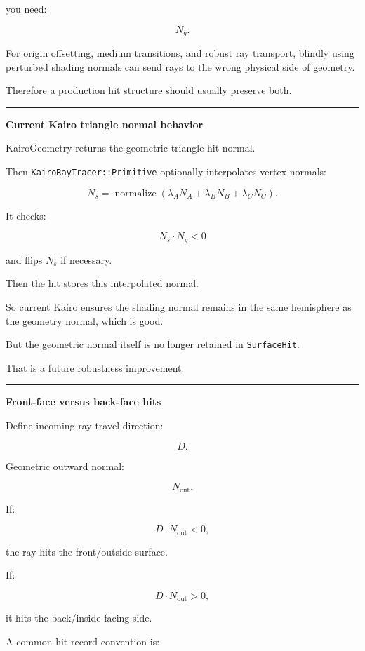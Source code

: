 you need:

\[
N_g.
\]

For origin offsetting, medium transitions, and robust ray transport, blindly using perturbed shading normals can send rays to the wrong physical side of geometry.

Therefore a production hit structure should usually preserve both.

\begin{center}\rule{0.5\linewidth}{0.5pt}\end{center}

\textbf{Current Kairo triangle normal behavior}

KairoGeometry returns the geometric triangle hit normal.

Then \texttt{KairoRayTracer::Primitive} optionally interpolates vertex normals:

\[
N_s=
\operatorname{normalize}
(
\lambda_A N_A+
\lambda_B N_B+
\lambda_C N_C
).
\]

It checks:

\[
N_s\cdot N_g<0
\]

and flips \(N_s\) if necessary.

Then the hit stores this interpolated normal.

So current Kairo ensures the shading normal remains in the same hemisphere as the geometry normal, which is good.

But the geometric normal itself is no longer retained in \texttt{SurfaceHit}.

That is a future robustness improvement.

\begin{center}\rule{0.5\linewidth}{0.5pt}\end{center}

\textbf{Front-face versus back-face hits}

Define incoming ray travel direction:

\[
D.
\]

Geometric outward normal:

\[
N_{\text{out}}.
\]

If:

\[
D\cdot N_{\text{out}}<0,
\]

the ray hits the front/outside surface.

If:

\[
D\cdot N_{\text{out}}>0,
\]

it hits the back/inside-facing side.

A common hit-record convention is:

